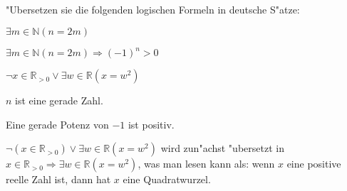 "Ubersetzen sie die folgenden logischen Formeln in deutsche S"atze:
\begin{teilaufgaben}
\item $\exists m\in\mathbb N (n=2m)$
\item $\exists m\in\mathbb N (n=2m)\Rightarrow (-1)^n > 0$
\item $\neg x\in\mathbb R_{>0}\vee \exists w\in\mathbb R(x=w^2)$
\end{teilaufgaben}

\begin{loesung}
\begin{teilaufgaben}
\item $n$ ist eine gerade Zahl.
\item Eine gerade Potenz von $-1$ ist positiv.
\item $\neg (x\in\mathbb R_{>0})\vee \exists w\in\mathbb R(x=w^2)$ wird zun"achst
"ubersetzt in
$x\in\mathbb R_{>0}\Rightarrow \exists w\in\mathbb R(x=w^2)$, was man lesen
kann als: wenn $x$ eine positive reelle Zahl ist, dann hat $x$ eine
Quadratwurzel.
\end{teilaufgaben}
\end{loesung}

